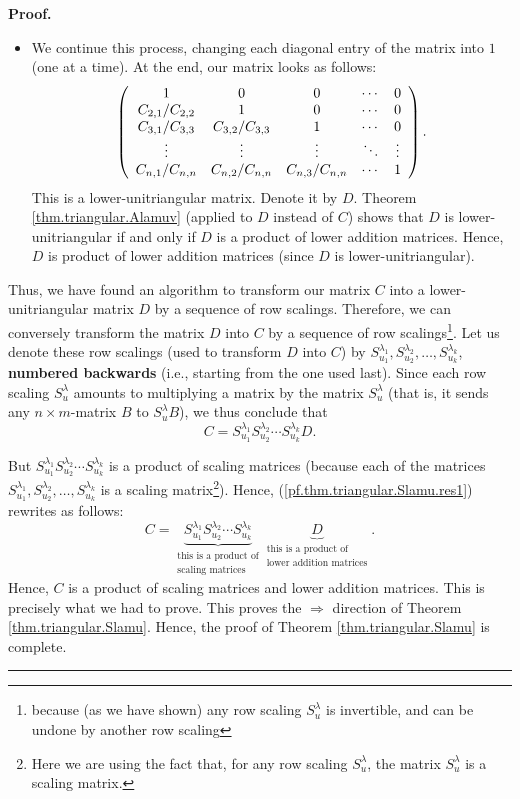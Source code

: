 \documentclass[numbers=enddot,12pt,final,onecolumn,notitlepage]{scrartcl}%
\theoremstyle{definition}
\newenvironment{proof}[1][Proof]{\noindent\textbf{#1.} }{\ \rule{0.5em}{0.5em}}
\begin{document}
\begin{proof}
\begin{itemize}
\item We continue this process, changing each diagonal entry of the matrix
into $1$ (one at a time). At the end, our matrix looks as follows:%
\[
\left(
\begin{array}
[c]{ccccc}%
1 & 0 & 0 & \cdots & 0\\
C_{2,1}/C_{2,2} & 1 & 0 & \cdots & 0\\
C_{3,1}/C_{3,3} & C_{3,2}/C_{3,3} & 1 & \cdots & 0\\
\vdots & \vdots & \vdots & \ddots & \vdots\\
C_{n,1}/C_{n,n} & C_{n,2}/C_{n,n} & C_{n,3}/C_{n,n} & \cdots & 1
\end{array}
\right)  .
\]
This is a lower-unitriangular matrix. Denote it by $D$. Theorem
\ref{thm.triangular.Alamuv} (applied to $D$ instead of $C$) shows that $D$ is
lower-unitriangular if and only if $D$ is a product of lower addition
matrices. Hence, $D$ is product of lower addition matrices (since $D$ is lower-unitriangular).
\end{itemize}

Thus, we have found an algorithm to transform our matrix $C$ into a
lower-unitriangular matrix $D$ by a sequence of row scalings. Therefore, we
can conversely transform the matrix $D$ into $C$ by a sequence of row
scalings\footnote{because (as we have shown) any row scaling $S_{u}^{\lambda}$
is invertible, and can be undone by another row scaling}. Let us denote these
row scalings (used to transform $D$ into $C$) by $S_{u_{1}}^{\lambda_{1}%
},S_{u_{2}}^{\lambda_{2}},\ldots,S_{u_{k}}^{\lambda_{k}}$, \textbf{numbered
backwards} (i.e., starting from the one used last). Since each row scaling
$S_{u}^{\lambda}$ amounts to multiplying a matrix by the matrix $S_{u}%
^{\lambda}$ (that is, it sends any $n\times m$-matrix $B$ to $S_{u}^{\lambda
}B$), we thus conclude that
\begin{equation}
C=S_{u_{1}}^{\lambda_{1}}S_{u_{2}}^{\lambda_{2}}\cdots S_{u_{k}}^{\lambda_{k}%
}D. \label{pf.thm.triangular.Slamu.res1}%
\end{equation}


But $S_{u_{1}}^{\lambda_{1}}S_{u_{2}}^{\lambda_{2}}\cdots S_{u_{k}}%
^{\lambda_{k}}$ is a product of scaling matrices (because each of the matrices
$S_{u_{1}}^{\lambda_{1}},S_{u_{2}}^{\lambda_{2}},\ldots,S_{u_{k}}^{\lambda
_{k}}$ is a scaling matrix\footnote{Here we are using the fact that, for any
row scaling $S_{u}^{\lambda}$, the matrix $S_{u}^{\lambda}$ is a scaling
matrix.}). Hence, (\ref{pf.thm.triangular.Slamu.res1}) rewrites as follows:%
\[
C=\underbrace{S_{u_{1}}^{\lambda_{1}}S_{u_{2}}^{\lambda_{2}}\cdots S_{u_{k}%
}^{\lambda_{k}}}_{\substack{\text{this is a product of}\\\text{scaling
matrices}}}\underbrace{D}_{\substack{\text{this is a product of}\\\text{lower
addition matrices}}}.
\]
Hence, $C$ is a product of scaling matrices and lower addition matrices. This
is precisely what we had to prove. This proves the $\Longrightarrow$ direction
of Theorem \ref{thm.triangular.Slamu}. Hence, the proof of Theorem
\ref{thm.triangular.Slamu} is complete.
\end{proof}
\end{document}

